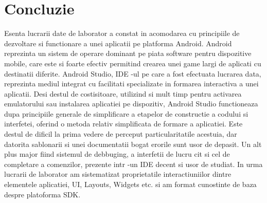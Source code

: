 \section*{Concluzie}
 	
	Esenta lucrarii date de laborator a constat in acomodarea cu principiile de dezvoltare si functionare a unei aplicatii pe platforma Android. Android reprezinta un sistem de operare dominant pe piata software pentru dispozitive mobile, care este si foarte efectiv permitind crearea unei game largi de aplicati cu destinatii diferite. Android Studio, IDE -ul pe care a fost efectuata lucrarea data, reprezinta mediul integrat cu facilitati specializate in formarea interactiva a unei aplicatii. Desi destul de costisitoare, utilizind si mult timp pentru activarea emulatorului sau instalarea aplicatiei pe dispozitiv, Android Studio functioneaza dupa principiile generale de simplificare a etapelor de constructie a codului si interfetei, oferind o metoda relativ simplificata de formare a aplicatiei. Este destul de dificil la prima vedere de perceput particularitatile acestuia, dar datorita sablonarii si unei documentatii bogat erorile sunt usor de depasit. Un alt plus major fiind sistemul de debbuging, a interfetii de lucru cit si cel de completare a comenzilor, prezente intr -un IDE decent si usor de studiat. In urma lucrarii de laborator am sistematizat proprietatile interactiuniilor dintre elementele aplicatiei, UI, Layouts, Widgets etc. si am format cunostinte de baza despre platoforma SDK.

\clearpage